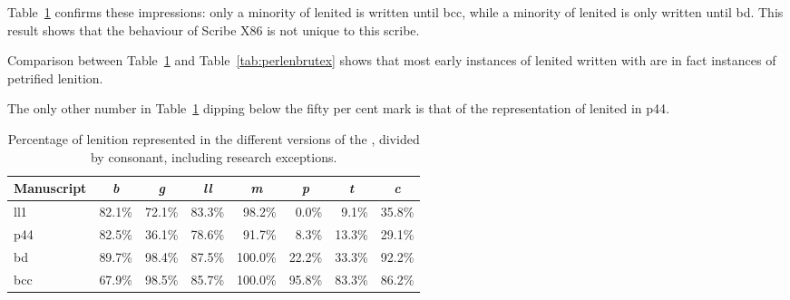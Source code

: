 Table~\ref{tab:perlenbrut} confirms these impressions: only a minority of lenited  is written until \gls{bcc}, while a minority of lenited  is only written until \gls{bd}.
This result shows that the behaviour of Scribe X86 is not unique to this scribe. 

Comparison between Table~\ref{tab:perlenbrut} and Table~\ref{tab:perlenbrutex} shows that most early instances of lenited  written with  are in fact instances of petrified lenition. 

The only other number in Table~\ref{tab:perlenbrut} dipping below the fifty per cent mark is that of the representation of lenited  in \gls{p44}.
\begin{table}[h]
  \centering
  \begin{tabular}{lrrrrrrr}
    \toprule
    \textbf{Manuscript} & \multicolumn{1}{c}{\textit{\textbf{b}}} & \multicolumn{1}{c}{\textit{\textbf{g}}} & \multicolumn{1}{c}{\textit{\textbf{ll}}} & \multicolumn{1}{c}{\textit{\textbf{m}}} & \multicolumn{1}{c}{\textit{\textbf{p}}} & \multicolumn{1}{c}{\textit{\textbf{t}}} & \multicolumn{1}{c}{\textit{\textbf{c}}} \\
    \midrule
    \gls{ll1} & 82.1\% & 72.1\% & 83.3\% & 98.2\% & 0.0\% & 9.1\% & 35.8\% \\
    \gls{p44} & 82.5\% & 36.1\% & 78.6\% & 91.7\% & 8.3\% & 13.3\% & 29.1\% \\
    \gls{bd} & 89.7\% & 98.4\% & 87.5\% & 100.0\% & 22.2\% & 33.3\% & 92.2\% \\
    \gls{bcc} & 67.9\% & 98.5\% & 85.7\% & 100.0\% & 95.8\% & 83.3\% & 86.2\% \\
    \bottomrule
  \end{tabular}%
  \caption{Percentage of lenition represented in the different
    versions of the , divided by consonant, including research exceptions.}
  \label{tab:perlenbrut}
\end{table}

